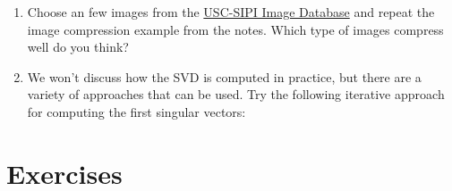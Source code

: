 \documentclass[
]{book}
\newenvironment{Shaded}{\begin{snugshade}}{\end{snugshade}}
\newcommand{\ControlFlowTok}[1]{\textcolor[rgb]{0.13,0.29,0.53}{\textbf{#1}}}
\newcommand{\DecValTok}[1]{\textcolor[rgb]{0.00,0.00,0.81}{#1}}
\newcommand{\FunctionTok}[1]{\textcolor[rgb]{0.13,0.29,0.53}{\textbf{#1}}}
\newcommand{\NormalTok}[1]{#1}
\newcommand{\OtherTok}[1]{\textcolor[rgb]{0.56,0.35,0.01}{#1}}
\newcommand{\SpecialCharTok}[1]{\textcolor[rgb]{0.81,0.36,0.00}{\textbf{#1}}}
\theoremstyle{definition}
\theoremstyle{definition}
\theoremstyle{definition}
\theoremstyle{definition}
\theoremstyle{remark}
\begin{document}
\begin{enumerate}
\def\labelenumi{\arabic{enumi}.}
\setcounter{enumi}{2}
\item
  Choose an few images from the \href{http://sipi.usc.edu/database/}{USC-SIPI Image Database} and repeat the image compression example from the notes. Which type of images compress well do you think?
\item
  We won't discuss how the SVD is computed in practice, but there are a variety of approaches that can be used. Try the following iterative approach for computing the first singular vectors:
\end{enumerate}

\begin{Shaded}
\end{Shaded}

\section{Exercises}\label{exercises-ch3}
\end{document}
